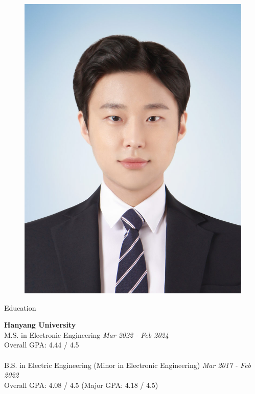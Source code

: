 \documentclass[
	11pt, %
]{resume} %
\begin{document}
\begin{figure}[h!]
    \centerline{\includegraphics[width=0.3\columnwidth]{../../img/2.jpg}}
  \end{figure}


\begin{rSection}{Education}
	
	\textbf{Hanyang University} \\ 
	M.S. in Electronic Engineering \hfill \textit{Mar 2022 - Feb 2024}  \\
	Overall GPA: 4.44 / 4.5\\
	\\
	B.S. in Electric Engineering (Minor in Electronic Engineering) \hfill \textit{Mar 2017 - Feb 2022} \\
	Overall GPA: 4.08 / 4.5 (Major GPA: 4.18 / 4.5) \\
	
\end{rSection}

\end{document}
